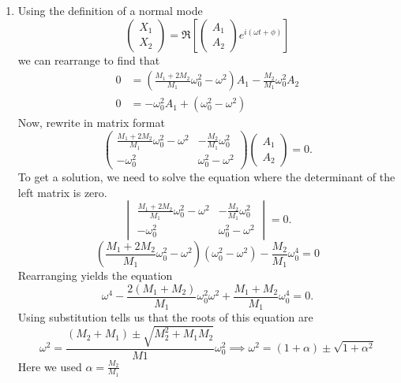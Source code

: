 \begin{sol}
\begin{enumerate}[label=\textbf{(\alph*)}]
   \item Using the definition of a normal mode 
\[
\begin{pmatrix}
X_1 \\
X_2 
\end{pmatrix}
= 
\Re \left[
\begin{pmatrix}
A_1 \\
A_2 
\end{pmatrix}
e^{i (\omega t + \phi)}
\right]
\]
we can rearrange to find that 
\begin{align*}
    0 &= \left(\frac{M_1 + 2M_2}{M_1}\omega_0^2 - \omega^2\right)A_1 - \frac{M_2}{M_1}\omega_0^2 A_2\\
    0 &= -\omega_0^2 A_1 + \left(\omega_0^2 - \omega^2\right)
\end{align*}
Now, rewrite in matrix format 
\[
\begin{pmatrix}
 \frac{M_1 + 2M_2}{M_1}\omega_0^2 - \omega^2 & -\frac{M_2}{M_1}\omega_0^2 \\ 
 -\omega_0^2 & \omega_0^2 - \omega^2
\end{pmatrix}
\begin{pmatrix}
A_1 \\
A_2
\end{pmatrix}
=0.
\]
To get a solution, we need to solve the equation where the determinant of the left matrix is zero.
\[
\begin{vmatrix}
\frac{M_1 + 2M_2}{M_1}\omega_0^2 - \omega^2 & -\frac{M_2}{M_1}\omega_0^2 \\ 
 -\omega_0^2 & \omega_0^2 - \omega^2
\end{vmatrix}
= 0.
\]
\[\left(\frac{M_1 + 2M_2}{M_1}\omega_0^2 - \omega^2\right)\left(\omega_0^2 - \omega^2\right) - \frac{M_2}{M_1}\omega_0^4 = 0\]
Rearranging yields the equation 
\[\omega^4 - \frac{2 (M_1 + M_2)}{M_1}\omega_0^2 \omega^2 + \frac{M_1 + M_2}{M_1}\omega_0^4 = 0.\]
Using substitution tells us that the roots of this equation are 
$$ \omega^2 = \frac{(M_2+M_1) \pm \sqrt {M_2^2 + M_1M_2}}{M1} \omega_0^2 \implies \omega^2 = (1+\alpha) \pm \sqrt {1+ \alpha^2}$$
Here we used $\alpha = \frac{M_2}{M_1}$
\end{enumerate}
\end{sol}